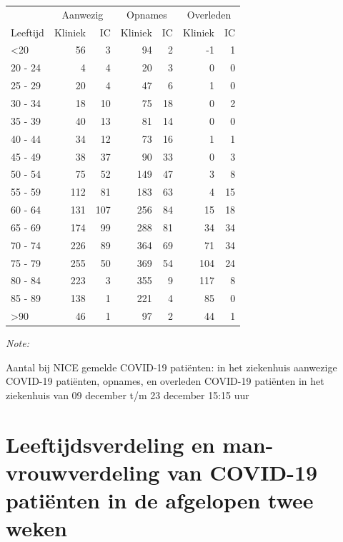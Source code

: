 \documentclass[
  english,
  man,floatsintext]{apa6}
\begin{document}
\begin{table}
\centering\begingroup\fontsize{10}{12}\selectfont

\begin{threeparttable}
\begin{tabular}{lrrrrrr}
\toprule
\multicolumn{1}{c}{ } & \multicolumn{2}{c}{Aanwezig} & \multicolumn{2}{c}{Opnames} & \multicolumn{2}{c}{Overleden} \\
\cmidrule(l{3pt}r{3pt}){2-3} \cmidrule(l{3pt}r{3pt}){4-5} \cmidrule(l{3pt}r{3pt}){6-7}
Leeftijd & Kliniek & IC & Kliniek & IC & Kliniek & IC\\
\midrule
<20 & 56 & 3 & 94 & 2 & -1 & 1\\
20 - 24 & 4 & 4 & 20 & 3 & 0 & 0\\
25 - 29 & 20 & 4 & 47 & 6 & 1 & 0\\
30 - 34 & 18 & 10 & 75 & 18 & 0 & 2\\
35 - 39 & 40 & 13 & 81 & 14 & 0 & 0\\
40 - 44 & 34 & 12 & 73 & 16 & 1 & 1\\
45 - 49 & 38 & 37 & 90 & 33 & 0 & 3\\
50 - 54 & 75 & 52 & 149 & 47 & 3 & 8\\
55 - 59 & 112 & 81 & 183 & 63 & 4 & 15\\
60 - 64 & 131 & 107 & 256 & 84 & 15 & 18\\
65 - 69 & 174 & 99 & 288 & 81 & 34 & 34\\
70 - 74 & 226 & 89 & 364 & 69 & 71 & 34\\
75 - 79 & 255 & 50 & 369 & 54 & 104 & 24\\
80 - 84 & 223 & 3 & 355 & 9 & 117 & 8\\
85 - 89 & 138 & 1 & 221 & 4 & 85 & 0\\
>90 & 46 & 1 & 97 & 2 & 44 & 1\\
\bottomrule
\end{tabular}
\begin{tablenotes}
\item \textit{Note: } 
\item Aantal bij NICE gemelde COVID-19 patiënten: in het ziekenhuis aanwezige COVID-19 patiënten, opnames, en overleden COVID-19 patiënten in het ziekenhuis van 09 december t/m 23 december 15:15 uur
\end{tablenotes}
\end{threeparttable}
\endgroup{}
\end{table}

\newpage

\hypertarget{leeftijdsverdeling-en-man-vrouwverdeling-van-covid-19-patiuxebnten-in-de-afgelopen-twee-weken}{%
\section{Leeftijdsverdeling en man-vrouwverdeling van COVID-19 patiënten in de afgelopen twee weken}\label{leeftijdsverdeling-en-man-vrouwverdeling-van-covid-19-patiuxebnten-in-de-afgelopen-twee-weken}}
\end{document}
